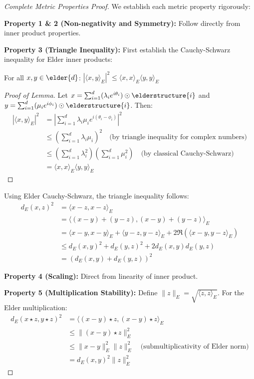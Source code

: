 \begin{proof}[Complete Metric Properties Proof]
We establish each metric property rigorously:

\textbf{Property 1 \& 2 (Non-negativity and Symmetry):} Follow directly from inner product properties.

\textbf{Property 3 (Triangle Inequality):} 
First establish the Cauchy-Schwarz inequality for Elder inner products:

\begin{lemma}
\label{lem:elder_cauchy_schwarz}
For all $x, y \in \elder{d}$: $|\langle x, y \rangle_E|^2 \leq \langle x, x \rangle_E \langle y, y \rangle_E$
\end{lemma}

\begin{proof}[Proof of Lemma]
Let $x = \sum_{i=1}^{d} (\lambda_i e^{i\theta_i}) \odot \elderstructure{i}$ and $y = \sum_{i=1}^{d} (\mu_i e^{i\phi_i}) \odot \elderstructure{i}$. Then:
\begin{align}
|\langle x, y \rangle_E|^2 &= \left|\sum_{i=1}^d \lambda_i \mu_i e^{i(\theta_i - \phi_i)}\right|^2\\
&\leq \left(\sum_{i=1}^d \lambda_i \mu_i\right)^2 \quad \text{(by triangle inequality for complex numbers)}\\
&\leq \left(\sum_{i=1}^d \lambda_i^2\right)\left(\sum_{i=1}^d \mu_i^2\right) \quad \text{(by classical Cauchy-Schwarz)}\\
&= \langle x, x \rangle_E \langle y, y \rangle_E
\end{align}
\end{proof}

Using Elder Cauchy-Schwarz, the triangle inequality follows:
\begin{align}
d_E(x, z)^2 &= \langle x - z, x - z \rangle_E\\
&= \langle (x - y) + (y - z), (x - y) + (y - z) \rangle_E\\
&= \langle x - y, x - y \rangle_E + \langle y - z, y - z \rangle_E + 2\Re(\langle x - y, y - z \rangle_E)\\
&\leq d_E(x, y)^2 + d_E(y, z)^2 + 2d_E(x, y)d_E(y, z)\\
&= (d_E(x, y) + d_E(y, z))^2
\end{align}

\textbf{Property 4 (Scaling):} Direct from linearity of inner product.

\textbf{Property 5 (Multiplication Stability):} 
Define $\|z\|_E = \sqrt{\langle z, z \rangle_E}$. For the Elder multiplication:
\begin{align}
d_E(x \star z, y \star z)^2 &= \langle (x - y) \star z, (x - y) \star z \rangle_E\\
&\leq \|(x - y) \star z\|_E^2\\
&\leq \|x - y\|_E^2 \|z\|_E^2 \quad \text{(submultiplicativity of Elder norm)}\\
&= d_E(x, y)^2 \|z\|_E^2
\end{align}


\end{proof}
